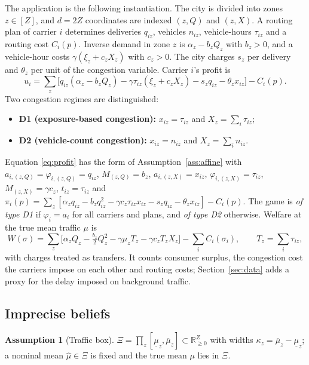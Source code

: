 \documentclass[preprint,12pt]{elsarticle}
\theoremstyle{definition}
\newtheorem{assumption}{Assumption}
\theoremstyle{remark}
\newcommand{\R}{\mathbb{R}}
\begin{document}
The application is the following instantiation. The city is divided into zones $z\in[Z]$, and $d=2Z$ coordinates are indexed $(z,Q)$ and $(z,X)$. A routing plan of carrier $i$ determines deliveries $q_{iz}$, vehicles $n_{iz}$, vehicle-hours $\tau_{iz}$ and a routing cost $C_i(p)$. Inverse demand in zone $z$ is $\alpha_z-b_zQ_z$ with $b_z>0$, and a vehicle-hour costs $\gamma(\xi_z+c_zX_z)$ with $c_z>0$. The city charges $s_z$ per delivery and $\theta_z$ per unit of the congestion variable. Carrier $i$'s profit is
\begin{equation}\label{eq:profit}
u_i=\sum_z\big[q_{iz}(\alpha_z-b_zQ_z)-\gamma\tau_{iz}(\xi_z+c_zX_z)-s_zq_{iz}-\theta_zx_{iz}\big]-C_i(p).
\end{equation}
Two congestion regimes are distinguished:
\begin{itemize}[leftmargin=*]
\item \textbf{D1 (exposure-based congestion):} $x_{iz}=\tau_{iz}$ and $X_z=\sum_i\tau_{iz}$;
\item \textbf{D2 (vehicle-count congestion):} $x_{iz}=n_{iz}$ and $X_z=\sum_in_{iz}$.
\end{itemize}
Equation \eqref{eq:profit} has the form of Assumption~\ref{ass:affine} with $a_{i,(z,Q)}=\varphi_{i,(z,Q)}=q_{iz}$, $M_{(z,Q)}=b_z$, $a_{i,(z,X)}=x_{iz}$, $\varphi_{i,(z,X)}=\tau_{iz}$, $M_{(z,X)}=\gamma c_z$, $t_{iz}=\tau_{iz}$ and $\pi_i(p)=\sum_z[\alpha_zq_{iz}-b_zq_{iz}^2-\gamma c_z\tau_{iz}x_{iz}-s_zq_{iz}-\theta_zx_{iz}]-C_i(p)$. The game is \emph{of type D1} if $\varphi_i=a_i$ for all carriers and plans, and \emph{of type D2} otherwise. Welfare at the true mean traffic $\mu$ is
\begin{equation}\label{eq:welfare}
W(\sigma)=\sum_z\big[\alpha_zQ_z-\tfrac{b_z}{2}Q_z^2-\gamma\mu_zT_z-\gamma c_zT_zX_z\big]-\sum_iC_i(\sigma_i),\qquad T_z=\textstyle\sum_i\tau_{iz},
\end{equation}
with charges treated as transfers. It counts consumer surplus, the congestion cost the carriers impose on each other and routing costs; Section~\ref{sec:data} adds a proxy for the delay imposed on background traffic.

\subsection{Imprecise beliefs}

\begin{assumption}[Traffic box]\label{ass:traffic}
$\Xi=\prod_z[\underline\mu_z,\overline\mu_z]\subset\R^Z_{\ge0}$ with widths $\kappa_z=\overline\mu_z-\underline\mu_z$; a nominal mean $\hat\mu\in\Xi$ is fixed and the true mean $\mu$ lies in $\Xi$.
\end{assumption}
\end{document}
